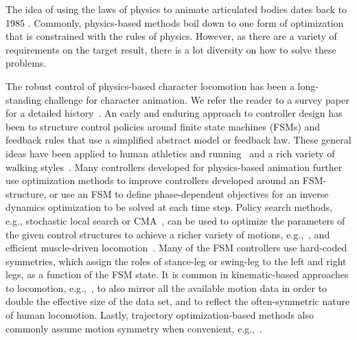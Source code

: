 The idea of using the laws of physics to animate articulated bodies dates back to 1985 \cite{Armstrong1985}. Commonly, physics-based methods boil down to one form of optimization that is constrained with the rules of physics. However, as there are a variety of requirements on the target result, there is a lot diversity on how to solve these problems.

% 
The robust control of physics-based character locomotion has been a long-standing challenge
for character animation. We refer the reader to a survey paper for a detailed history~\cite{STAR2012}.  
An early and enduring approach to controller design has been to structure control policies around finite state
machines (FSMs) and feedback rules that use a simplified abstract model or feedback law.  These general
ideas have been applied to human athletics and running~\cite{Hodgins95} and a rich variety of walking
styles~\cite{Yin07,Coros10,LeeYS10}. Many controllers developed for physics-based animation
further use optimization methods to improve controllers developed around an FSM-structure, or use an FSM to 
define phase-dependent objectives for an inverse dynamics optimization to be solved at each time step.
Policy search methods, e.g., stochastic local search or CMA~\cite{Hansen06}, can be used to optimize the 
parameters of the given control structures to achieve a richer variety of motions, e.g.,~\cite{Yin07,Coros11}, and
efficient muscle-driven locomotion~\cite{Wang09}.  
Many of the FSM controllers use hard-coded symmetries, which assign the roles of stance-leg or swing-leg
to the left and right legs, as a function of the FSM state.
It is common in kinematic-based approaches to locomotion, e.g.,~\cite{bruderlin,HoldenPFNN}, 
to also mirror all the available motion data
in order to double the effective size of the data set, and to reflect the often-symmetric nature of human locomotion.
Lastly, trajectory optimization-based methods also commonly assume motion symmetry when convenient, e.g.,~\cite{majkowska2007flipping}.

